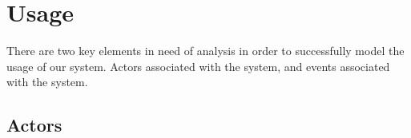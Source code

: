 \section{Usage}

There are two key elements in need of analysis in order to successfully model the usage of our system. Actors associated with the system, and events associated with the system.




\subsection{Actors}


